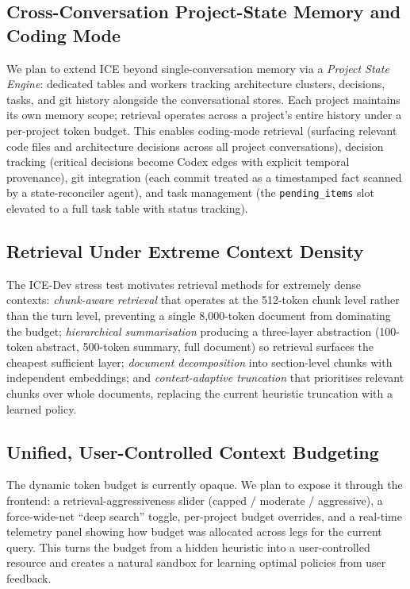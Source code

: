 \documentclass[10pt]{article}
\begin{document}
\subsection{Cross-Conversation Project-State Memory and Coding Mode}
We plan to extend ICE beyond single-conversation memory via a \emph{Project State Engine}: dedicated tables and workers tracking architecture clusters, decisions, tasks, and git history alongside the conversational stores. Each project maintains its own memory scope; retrieval operates across a project's entire history under a per-project token budget. This enables coding-mode retrieval (surfacing relevant code files and architecture decisions across all project conversations), decision tracking (critical decisions become Codex edges with explicit temporal provenance), git integration (each commit treated as a timestamped fact scanned by a state-reconciler agent), and task management (the \texttt{pending\_items} slot elevated to a full task table with status tracking).

\subsection{Retrieval Under Extreme Context Density}
The ICE-Dev stress test motivates retrieval methods for extremely dense contexts: \emph{chunk-aware retrieval} that operates at the 512-token chunk level rather than the turn level, preventing a single 8{,}000-token document from dominating the budget; \emph{hierarchical summarisation} producing a three-layer abstraction (100-token abstract, 500-token summary, full document) so retrieval surfaces the cheapest sufficient layer; \emph{document decomposition} into section-level chunks with independent embeddings; and \emph{context-adaptive truncation} that prioritises relevant chunks over whole documents, replacing the current heuristic truncation with a learned policy.

\subsection{Unified, User-Controlled Context Budgeting}
The dynamic token budget is currently opaque. We plan to expose it through the frontend: a retrieval-aggressiveness slider (capped / moderate / aggressive), a force-wide-net ``deep search'' toggle, per-project budget overrides, and a real-time telemetry panel showing how budget was allocated across legs for the current query. This turns the budget from a hidden heuristic into a user-controlled resource and creates a natural sandbox for learning optimal policies from user feedback.
\end{document}

